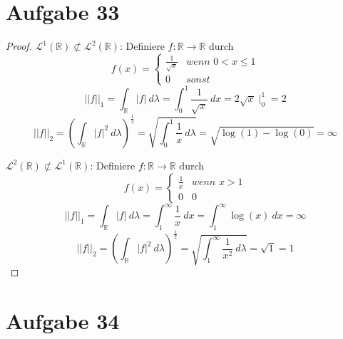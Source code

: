 \documentclass[10pt,a4paper]{article}
\begin{document}
\section{Aufgabe 33}
\begin{proof}
  $\mathscr{L}^{1}(\mathbb{R}) \not\subset \mathscr{L}^{2}(\mathbb{R})$: Definiere $f: \mathbb{R} \rightarrow \mathbb{R}$ durch
  \begin{equation}
    f(x) =
    \begin{cases}
      \frac{1}{\sqrt{x}} & \textit{wenn $0 < x \le 1$}\\
      0 & \textit{sonst}
    \end{cases}
  \end{equation}
  \begin{equation}
    ||f||_{1} = \int_{\mathbb{R}} |f|\ d\lambda = \int_{0}^{1} \frac{1}{\sqrt{x}}\ dx = 2\sqrt{x} \mid_{0}^{1} = 2
  \end{equation}
  \begin{equation}
    ||f||_{2} = \left( \int_{\mathbb{R}} |f|^{2}\ d\lambda \right)^{\frac{1}{2}} = \sqrt{\int_{0}^{1} \frac{1}{x}\ d\lambda} = \sqrt{\log(1) - \log(0)} = \infty
  \end{equation}

  $\mathscr{L}^{2}(\mathbb{R}) \not\subset \mathscr{L}^{1}(\mathbb{R})$: Definiere $f: \mathbb{R} \rightarrow \mathbb{R}$ durch
  \begin{equation}
    f(x) =
    \begin{cases}
      \frac{1}{x} & \textit{wenn $x > 1$}\\
      0 & \textit{0}
    \end{cases}
  \end{equation}
  \begin{equation}
    ||f||_{1} = \int_{\mathbb{R}} |f|\ d\lambda = \int_{1}^{\infty} \frac{1}{x}\ dx = \int_{1}^{\infty} \log(x)\ dx = \infty
  \end{equation}
  \begin{equation}
    ||f||_{2} = \left( \int_{\mathbb{R}} |f|^{2}\ d\lambda \right)^{\frac{1}{2}} = \sqrt{\int_{1}^{\infty} \frac{1}{x^{2}}\ d\lambda} = \sqrt{1} = 1
  \end{equation}
\end{proof}

\section{Aufgabe 34}
\end{document}
